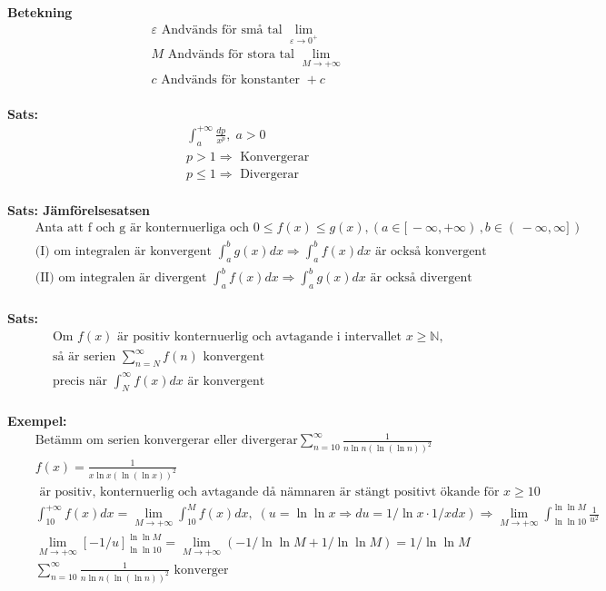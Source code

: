 \documentclass{article}
\begin{document}
\textbf{Betekning}
\begin{align*}
  &\quad  \varepsilon \text{ Andvänds för små tal }  \lim_{\varepsilon \to 0^+} \\
  &\quad  M \text{ Andvänds för stora tal } \lim_{M \to +\infty} \\
  &\quad  c \text{ Andvänds för konstanter } +c \\
\end{align*}

\textbf{Sats: }
\begin{align*}
  &\quad  \int_a^{+\infty} \frac{dp}{x^p}, \; a>0 \\
  &\quad  p > 1 \Rightarrow \text{ Konvergerar} \\
  &\quad  p \leq 1 \Rightarrow \text{ Divergerar} \\
\end{align*}

\textbf{Sats: Jämförelsesatsen}
\begin{align*}
  &\quad  \text{Anta att f och g är konternuerliga och } 0 \leq f(x) \leq g(x),
  ( a \in [ \, -\infty,+\infty ) \, , b \in ( \, -\infty,\infty ] \, )\\
  &\quad  \text{(I) om integralen är konvergent } \int_a^b g(x)dx \Rightarrow \int_a^b f(x)dx
  \text{ är också konvergent} \\
  &\quad \text{(II) om integralen är divergent } \int_a^b f(x)dx \Rightarrow \int_a^b g(x)dx
  \text{ är också divergent} \\
\end{align*}

\textbf{Sats: }
\begin{align*}
  &\quad  \text{Om $f(x)$ är positiv konternuerlig och avtagande i intervallet $x\geq\mathbb{N}$,} \\
  &\quad  \text{så är serien }  \displaystyle\sum_{n=N}^{\infty} f(n) \text{ konvergent} \\ 
  &\quad  \text{precis när  }  \int_N^{\infty} f(x)dx \text{ är konvergent} \\
\end{align*}

\textbf{Exempel: }
\begin{align*}
  &\quad  \text{Betämm om serien konvergerar eller divergerar}
  \displaystyle\sum_{n=10}^{\infty} \frac{1}{n\ln{n}{(\ln{(\ln{n})})}^2}  \\
  &\quad  f(x) = \frac{1}{x\ln{x}{(\ln{(\ln{x})})}^2} \\
  &\quad \text{ är positiv, konternuerlig och avtagande då nämnaren är stängt positivt ökande för }
  x \geq 10 \\
  &\quad  \int_{10}^{+\infty} f(x)dx = \lim_{M\to\mathbb{+\infty}} \int_{10}^{M} f(x)dx, \;
  (u=\ln{\ln{x}} \Rightarrow du = 1/\ln{x} \cdot 1/x dx) \Rightarrow
  \lim_{M\to+\infty} \int_{\ln{\ln{10}}}^{\ln{\ln{M}}} \frac{1}{u^2} \\
  &\quad  \lim_{M\to+\infty} {[-1/u]}_{\ln{\ln{10}}}^{\ln{\ln{M}}} =
  \lim_{M\to+\infty} (-1/\ln{\ln{M}}+1/\ln{\ln{M}}) = 1/\ln{\ln{M}} \\
  &\quad  \displaystyle\sum_{n=10}^{\infty} \frac{1}{n\ln{n}{(\ln{(\ln{n})})}^2} \text{ konverger} \\
\end{align*}
\end{document}
